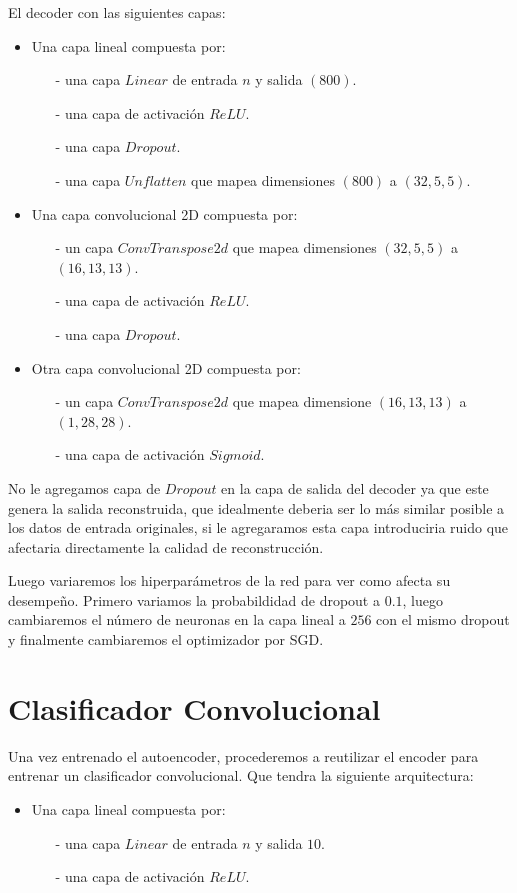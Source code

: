 \documentclass[aps,prl,reprint,groupedaddress]{revtex4-2}
\begin{document}
El decoder con las siguientes capas:
\begin{itemize}
  \item Una capa lineal compuesta por:
  \begin{itemize}
    \item [-] una capa $Linear$ de entrada $n$ y salida $(800)$.
    \item [-] una capa de activación $ReLU$.
    \item [-] una capa $Dropout$.
    \item [-] una capa $Unflatten$ que mapea dimensiones $(800)$ a $(32, 5, 5)$.
  \end{itemize}
  \item Una capa convolucional 2D compuesta por:
  \begin{itemize}
    \item [-] un capa $ConvTranspose2d$ que mapea dimensiones $(32, 5, 5)$ a
    $(16, 13, 13)$.
    \item [-] una capa de activación $ReLU$.
    \item [-] una capa $Dropout$.
  \end{itemize}
  \item Otra capa convolucional 2D compuesta por:
  \begin{itemize}
    \item [-] un capa $ConvTranspose2d$ que mapea dimensione $(16, 13, 13)$ a
    $(1, 28, 28)$.
    \item [-] una capa de activación $Sigmoid$.
  \end{itemize}
\end{itemize}

No le agregamos capa de $Dropout$ en la capa de salida del decoder ya que 
este genera la salida reconstruida, que idealmente deberia ser lo más similar 
posible a los datos de entrada originales, si le agregaramos esta capa 
introduciria ruido que afectaria directamente la calidad de reconstrucción.

Luego variaremos los hiperparámetros de la red para ver como afecta su 
desempeño. Primero variamos la probabildidad de dropout a $0.1$, luego
cambiaremos el número de neuronas en la capa lineal a $256$ con el mismo 
dropout y finalmente cambiaremos el optimizador por SGD.

\section{Clasificador Convolucional}
Una vez entrenado el autoencoder, procederemos a reutilizar el encoder para
entrenar un clasificador convolucional. Que tendra la siguiente arquitectura:
\begin{itemize}
  \item Una capa lineal compuesta por:
  \begin{itemize}
    \item [-] una capa $Linear$ de entrada $n$ y salida $10$.
    \item [-] una capa de activación $ReLU$.
  \end{itemize}
\end{itemize}
\end{document}
